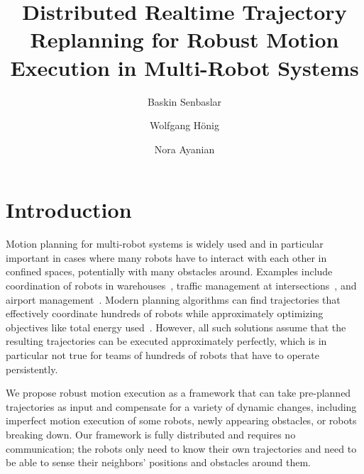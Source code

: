 \documentclass{svproc}
\begin{document}
\mainmatter              %
%
% 
\title{Distributed Realtime Trajectory Replanning for Robust Motion Execution in Multi-Robot Systems}


%
%
\author{Baskin Senbaslar \and Wolfgang H\"onig \and
Nora Ayanian}
%
%
%

\maketitle              %

\begin{abstract}
\end{abstract}


\section{Introduction}
Motion planning for multi-robot systems is widely used and in particular important in cases where many robots have to interact with each other in confined spaces, potentially with many obstacles around.
Examples include coordination of robots in warehouses~\cite{Kiva}, traffic management at intersections~\cite{IntersectionManagementDresner}, and airport management~\cite{AirportTug}.
Modern planning algorithms can find trajectories that effectively coordinate hundreds of robots while approximately optimizing objectives like total energy used~\cite{crazyplanning-ieeetro}.
However, all such solutions assume that the resulting trajectories can be executed approximately perfectly, which is in particular not true for teams of hundreds of robots that have to operate persistently.

We propose robust motion execution as a framework that can take pre-planned trajectories as input and compensate for a variety of dynamic changes, including imperfect motion execution of some robots, newly appearing obstacles, or robots breaking down.
Our framework is fully distributed and requires no communication; the robots only need to know their own trajectories and need to be able to sense their neighbors' positions and obstacles around them.
\end{document}
